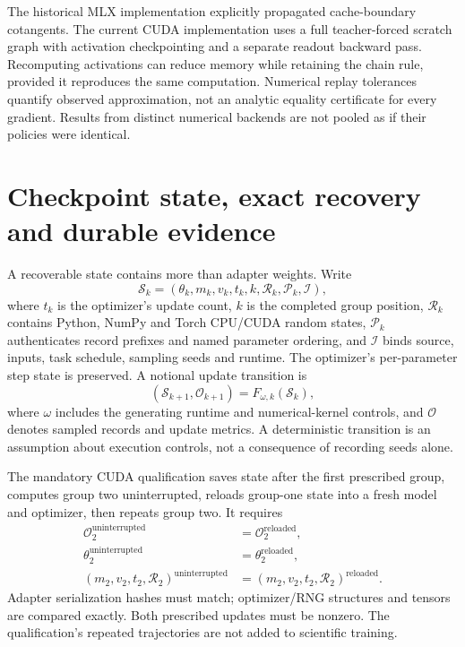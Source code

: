 \documentclass[11pt]{article}
\begin{document}
The historical MLX implementation explicitly propagated cache-boundary cotangents. The current CUDA implementation uses a full teacher-forced scratch graph with activation checkpointing and a separate readout backward pass. Recomputing activations can reduce memory while retaining the chain rule, provided it reproduces the same computation. Numerical replay tolerances quantify observed approximation, not an analytic equality certificate for every gradient. Results from distinct numerical backends are not pooled as if their policies were identical.

\section{Checkpoint state, exact recovery and durable evidence}
\label{sec:recovery}

A recoverable state contains more than adapter weights. Write
\begin{equation}
 \mathcal S_k=(\theta_k,m_k,v_k,t_k,k,\mathcal R_k,\mathcal P_k,\mathcal I),
\end{equation}
where $t_k$ is the optimizer's update count, $k$ is the completed group position, $\mathcal R_k$ contains Python, NumPy and Torch CPU/CUDA random states, $\mathcal P_k$ authenticates record prefixes and named parameter ordering, and $\mathcal I$ binds source, inputs, task schedule, sampling seeds and runtime. The optimizer's per-parameter step state is preserved. A notional update transition is
\begin{equation}
 (\mathcal S_{k+1},\mathcal O_{k+1})=F_{\omega,k}(\mathcal S_k),
\end{equation}
where $\omega$ includes the generating runtime and numerical-kernel controls, and $\mathcal O$ denotes sampled records and update metrics. A deterministic transition is an assumption about execution controls, not a consequence of recording seeds alone.

The mandatory CUDA qualification saves state after the first prescribed group, computes group two uninterrupted, reloads group-one state into a fresh model and optimizer, then repeats group two. It requires
\begin{align}
 \mathcal O_2^{\mathrm{uninterrupted}}&=\mathcal O_2^{\mathrm{reloaded}},\\
 \theta_2^{\mathrm{uninterrupted}}&=\theta_2^{\mathrm{reloaded}},\\
 (m_2,v_2,t_2,\mathcal R_2)^{\mathrm{uninterrupted}}
    &=(m_2,v_2,t_2,\mathcal R_2)^{\mathrm{reloaded}}.
\end{align}
Adapter serialization hashes must match; optimizer/RNG structures and tensors are compared exactly. Both prescribed updates must be nonzero. The qualification's repeated trajectories are not added to scientific training.
\end{document}
